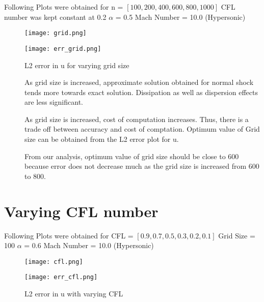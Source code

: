 \documentclass{article}
\begin{document}
Following Plots were obtained for n = $[100 , 200 , 400, 600, 800, 1000]$
\newline
CFL number was kept constant at 0.2
\newline
$\alpha$ = 0.5
\newline
Mach Number = 10.0 (Hypersonic)

\begin{figure}[H]   \label{figure}
\texttt{[image: grid.png]}
\label{figure:}
\end{figure}

\begin{figure}[H]   \label{figure}
\texttt{[image: err\_grid.png]}
\caption{ L2 error in u for varying grid size}
\label{figure:}
\end{figure}



\begin{description}
\item[] As grid size is increased, approximate solution obtained for normal shock tends more towards exact solution. Dissipation as well as dispersion effects are less significant.
\item[] As grid size is increased, cost of computation increases. Thus, there is a trade off between accuracy and cost of comptation. Optimum value of Grid size can be obtained from the L2 error plot for u. 
\item[] From our analysis, optimum value of grid size should be close to 600 because error does not decrease much as the grid size is increased from 600 to 800.
\end{description}
\newpage

\section*{Varying CFL number}

Following Plots were obtained for CFL = $[0.9, 0.7, 0.5, 0.3, 0.2,0.1]$
\newline
Grid Size = 100
\newline
$\alpha$ = 0.6
\newline
Mach Number = 10.0 (Hypersonic)

\begin{figure}[H]   \label{figure}
\texttt{[image: cfl.png]}
\label{figure:}
\end{figure}

\begin{figure}[H]   \label{figure}
\texttt{[image: err\_cfl.png]}
\caption{ L2 error in u with varying CFL}
\label{figure:}
\end{figure}
\end{document}
